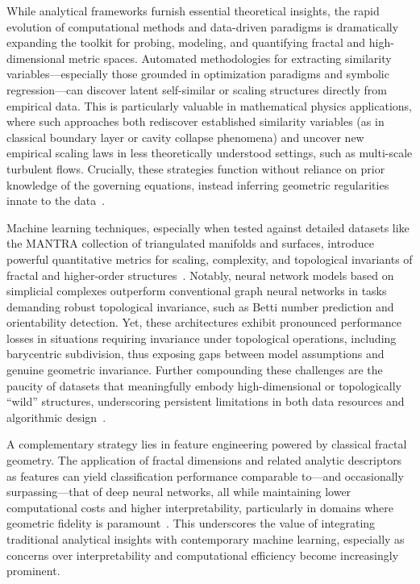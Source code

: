 \documentclass[sigconf]{acmart}
\begin{document}
While analytical frameworks furnish essential theoretical insights, the rapid evolution of computational methods and data-driven paradigms is dramatically expanding the toolkit for probing, modeling, and quantifying fractal and high-dimensional metric spaces. Automated methodologies for extracting similarity variables—especially those grounded in optimization paradigms and symbolic regression—can discover latent self-similar or scaling structures directly from empirical data. This is particularly valuable in mathematical physics applications, where such approaches both rediscover established similarity variables (as in classical boundary layer or cavity collapse phenomena) and uncover new empirical scaling laws in less theoretically understood settings, such as multi-scale turbulent flows. Crucially, these strategies function without reliance on prior knowledge of the governing equations, instead inferring geometric regularities innate to the data~\cite{ref65}.

Machine learning techniques, especially when tested against detailed datasets like the MANTRA collection of triangulated manifolds and surfaces, introduce powerful quantitative metrics for scaling, complexity, and topological invariants of fractal and higher-order structures~\cite{ref26,ref39}. Notably, neural network models based on simplicial complexes outperform conventional graph neural networks in tasks demanding robust topological invariance, such as Betti number prediction and orientability detection. Yet, these architectures exhibit pronounced performance losses in situations requiring invariance under topological operations, including barycentric subdivision, thus exposing gaps between model assumptions and genuine geometric invariance. Further compounding these challenges are the paucity of datasets that meaningfully embody high-dimensional or topologically ``wild'' structures, underscoring persistent limitations in both data resources and algorithmic design~\cite{ref39}.

A complementary strategy lies in feature engineering powered by classical fractal geometry. The application of fractal dimensions and related analytic descriptors as features can yield classification performance comparable to—and occasionally surpassing—that of deep neural networks, all while maintaining lower computational costs and higher interpretability, particularly in domains where geometric fidelity is paramount~\cite{ref26}. This underscores the value of integrating traditional analytical insights with contemporary machine learning, especially as concerns over interpretability and computational efficiency become increasingly prominent.
\end{document}
